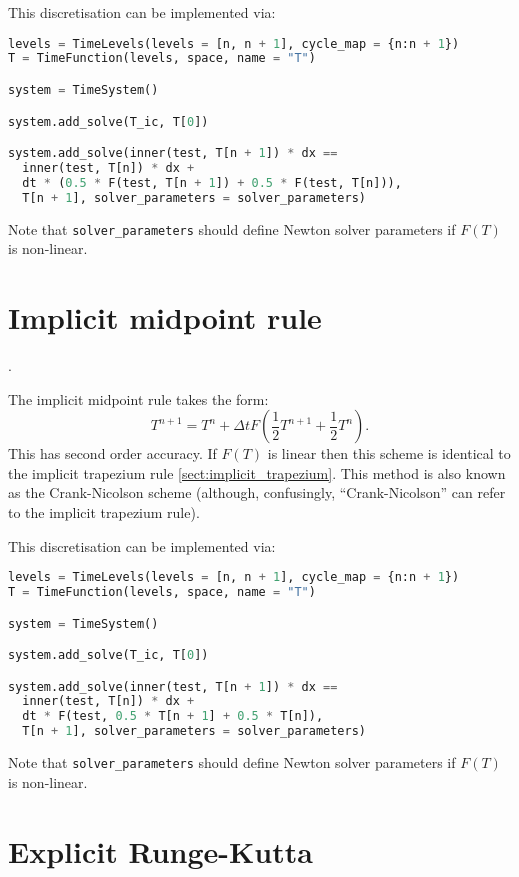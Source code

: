 \documentclass[a4paper]{book}
\begin{document}
This discretisation can be implemented via:
\begin{lstlisting}[language = python, frame = single, basicstyle=\footnotesize]
levels = TimeLevels(levels = [n, n + 1], cycle_map = {n:n + 1})
T = TimeFunction(levels, space, name = "T")

system = TimeSystem()

system.add_solve(T_ic, T[0])

system.add_solve(inner(test, T[n + 1]) * dx ==
  inner(test, T[n]) * dx +
  dt * (0.5 * F(test, T[n + 1]) + 0.5 * F(test, T[n])),
  T[n + 1], solver_parameters = solver_parameters)
\end{lstlisting}
Note that \verb+solver_parameters+ should define Newton solver parameters if
$F(T)$ is non-linear.

\section{Implicit midpoint rule}\label{sect:implicit_midpoint}.

The implicit midpoint rule takes the form:
\begin{equation}
  T^{n + 1} = T^n + \Delta t F \left( \frac{1}{2} T^{n + 1} + \frac{1}{2} T^n \right).
\end{equation}
This has second order accuracy. If $F(T)$ is linear then this scheme is
identical to the implicit trapezium rule \ref{sect:implicit_trapezium}. This
method is also known as the Crank-Nicolson scheme
\citep[e.g.][section 2.22]{mitchell1980} (although, confusingly,
``Crank-Nicolson'' can refer to the implicit trapezium rule).

This discretisation can be implemented via:
\begin{lstlisting}[language = python, frame = single, basicstyle=\footnotesize]
levels = TimeLevels(levels = [n, n + 1], cycle_map = {n:n + 1})
T = TimeFunction(levels, space, name = "T")

system = TimeSystem()

system.add_solve(T_ic, T[0])

system.add_solve(inner(test, T[n + 1]) * dx ==
  inner(test, T[n]) * dx +
  dt * F(test, 0.5 * T[n + 1] + 0.5 * T[n]),
  T[n + 1], solver_parameters = solver_parameters)
\end{lstlisting}
Note that \verb+solver_parameters+ should define Newton solver parameters if
$F(T)$ is non-linear.

\section{Explicit Runge-Kutta}
\end{document}
